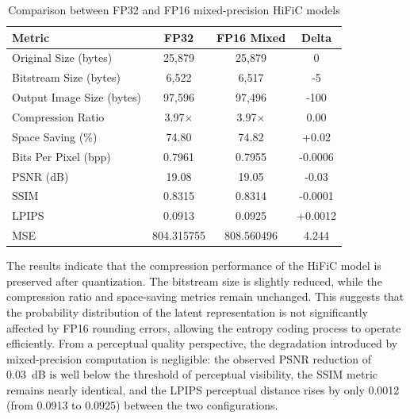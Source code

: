 \begin{table}[H]
\centering
\caption{Comparison between FP32 and FP16 mixed-precision HiFiC models}
\label{tab:quant_results}
\begin{tabular}{|l|c|c|c|}
\hline
\textbf{Metric} & \textbf{FP32} & \textbf{FP16 Mixed} & \textbf{Delta} \\
\hline
Original Size (bytes) & 25,879 & 25,879 & 0 \\
Bitstream Size (bytes) & 6,522 & 6,517 & -5 \\
Output Image Size (bytes) & 97,596 & 97,496 & -100 \\
Compression Ratio & 3.97$\times$ & 3.97$\times$ & 0.00 \\
Space Saving (\%) & 74.80 & 74.82 & +0.02 \\
Bits Per Pixel (bpp) & 0.7961 & 0.7955 & -0.0006 \\
PSNR (dB) & 19.08 & 19.05 & -0.03 \\
SSIM & 0.8315 & 0.8314 & -0.0001 \\
LPIPS & 0.0913 & 0.0925 & +0.0012 \\
MSE  &  804.315755 & 808.560496 & 4.244 \\
\hline
\end{tabular}
\end{table}

The results indicate that the compression performance of the HiFiC model is preserved after quantization. The bitstream size is slightly reduced, while the compression ratio and space-saving metrics remain unchanged. This suggests that the probability distribution of the latent representation is not significantly affected by FP16 rounding errors, allowing the entropy coding process to operate efficiently. From a perceptual quality perspective, the degradation introduced by mixed-precision computation is negligible: the observed PSNR reduction of 0.03~dB is well below the threshold of perceptual visibility, the SSIM metric remains nearly identical, and the LPIPS perceptual distance rises by only 0.0012 (from 0.0913 to 0.0925) between the two configurations.

